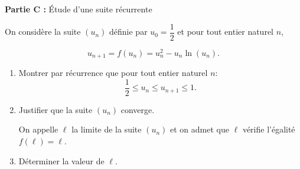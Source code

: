 \documentclass[10pt]{article}
\begin{document}
\medskip

\textbf{Partie C :} Étude d'une suite récurrente

On considère la suite $\left(u_n\right)$ définie par $u_0 = \dfrac12$ et pour tout entier naturel $n$,

\[u_{n+1} = f\left(u_n\right) = u_n^2  - u_n \ln \left(u_n\right).\]

\medskip

\begin{enumerate}
\item Montrer par récurrence que pour tout entier naturel $n$:
\[\dfrac12  \leqslant u_n \leqslant u_{n+1} \leqslant 1.\]

\item Justifier que la suite $\left(u_n\right)$ converge.

On appelle $\ell$ la limite de la suite $\left(u_n\right)$ et on admet que $\ell$ vérifie l'égalité $f(\ell) = \ell$.
\item Déterminer la valeur de $\ell$.
\end{enumerate}

\bigskip
\end{document}
